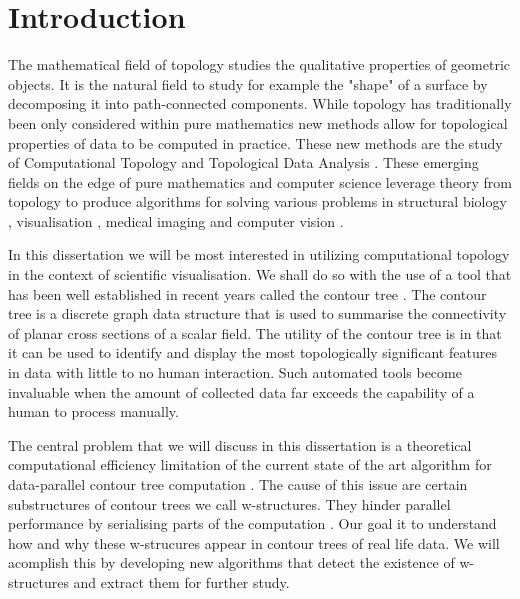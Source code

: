 \chapter{Introduction}
\label{chapter1}

The mathematical field of topology studies the qualitative properties of geometric objects. It is the natural field to study for example the "shape" of a surface by decomposing it into path-connected components. While topology has traditionally been only considered within pure mathematics new methods allow for topological properties of data to be computed in practice. These new methods are the study of Computational Topology \cite{topo-for-computing} and Topological Data Analysis \cite{topo-and-data}. These emerging fields on the edge of pure mathematics and computer science leverage theory from topology to produce algorithms for solving various problems in structural biology \cite{folded-molecules, hemo-globin}, visualisation \cite{topo-hierarchy, fiber-surfaces, flexible-isosurfaces}, medical imaging \cite{reeb-graph-brain} and
computer vision \cite{reeb-shape-analysis, structural-recognition}.

In this dissertation we will be most interested in utilizing computational topology in the context of scientific visualisation. We shall do so with the use of a tool that has been well established in recent years called the contour tree \cite{ct-big-paper}. The contour tree is a discrete graph data structure that is used to summarise the connectivity of planar cross sections of a scalar field. The utility of the contour tree is in that it can be used to identify and display the most topologically significant features in data with little to no human interaction. Such automated tools become invaluable when the amount of collected data far exceeds the capability of a human to process manually.

The central problem that we will discuss in this dissertation is a theoretical computational efficiency limitation of the current state of the art algorithm for data-parallel contour tree computation \cite{parallel-peak-pruning}. The cause of this issue are certain substructures of contour trees we call w-structures. They hinder parallel performance by serialising parts of the computation \cite{pathological-test-cases}. Our goal it to understand how and why these w-strucures appear in contour trees of real life data. We will acomplish this by developing new algorithms that detect the existence of w-structures and extract them for further study.

